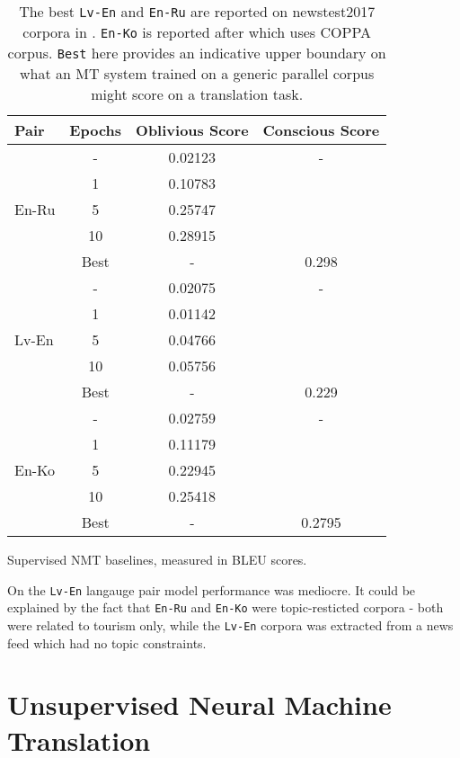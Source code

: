 \documentclass[]{article}
\begin{document}
\begin{table}
\begin{center}
\begin{tabular}{ l c c c }
Pair & Epochs & Oblivious Score & Conscious Score \\
\hline
\multirow{5}{4em}{En-Ru} & - & 0.02123 & - \\
& 1 & 0.10783 & \\
& 5 & 0.25747 & \\
& 10 & 0.28915 & \\
& Best & -  & 0.298 \\
\hline
\multirow{5}{4em}{Lv-En} & - & 0.02075 & - \\
& 1 & 0.01142 & \\
& 5 & 0.04766 & \\
& 10 & 0.05756 & \\
& Best & - & 0.229 \\
\hline
\multirow{5}{4em}{En-Ko} & - & 0.02759 & - \\
& 1 & 0.11179 & \\
& 5 & 0.22945 & \\
& 10 & 0.25418 & \\
& Best & - & 0.2795
\end{tabular}
\end{center}
\caption{Supervised NMT baselines, measured in BLEU scores.}
\caption*{\small
The best {\tt Lv-En} and  {\tt En-Ru} are reported on newstest2017 corpora in \cite{bojar2017findings}.
{\tt En-Ko} is reported after \cite{junczys2016coppa} which uses COPPA corpus.
{\tt Best} here provides an indicative upper boundary on what an MT system trained on a generic parallel corpus might score on a translation task.
}
\label{table:baselines}
\end{table}

On the {\tt Lv-En} langauge pair model performance was mediocre.
It could be explained by the fact that {\tt En-Ru} and {\tt En-Ko} were topic-resticted corpora - both were related to tourism only, while the {\tt Lv-En} corpora was extracted from a news feed which had no topic constraints.

\section{Unsupervised Neural Machine Translation}
\label{sect:unmt}
\end{document}

